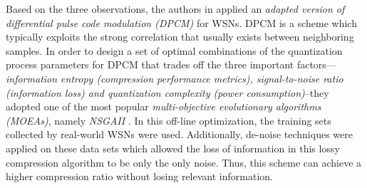 \begin{enumerate}
        Based on the three observations, the authors in \cite{Marcelloni:2010aa} applied an \emph{\textcolor[rgb]{1,0,0}{adapted version of differential pulse code modulation (DPCM)}} for WSNs. DPCM is a scheme which typically exploits the \textcolor[rgb]{1,0,0}{strong correlation that usually exists between neighboring samples}. In order to design a set of \textcolor[rgb]{1,0,0}{optimal combinations of the quantization process parameters for DPCM that trades off the three important factors}---\emph{\textcolor[rgb]{1,0,0}{information entropy (compression performance metrics), signal-to-noise ratio (information loss) and quantization complexity (power consumption)}}--they adopted one of the most popular \emph{\textcolor[rgb]{1,0,0}{multi-objective evolutionary algorithms (MOEAs)}}, namely \emph{\textcolor[rgb]{1,0,0}{NSGAII}} \cite{Deb2002}. In this off-line optimization, the training sets collected by real-world WSNs were used. Additionally, \textcolor[rgb]{1,0,0}{de-noise techniques} were applied on these data sets which allowed \textcolor[rgb]{1,0,0}{the loss of information in this lossy compression algorithm to be only the only noise}. Thus, this scheme can achieve a higher compression ratio without losing relevant information.
\end{enumerate}








